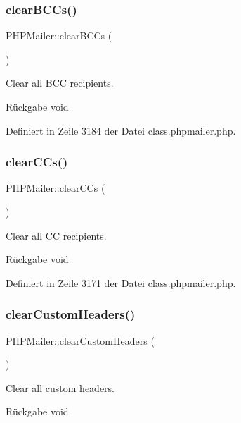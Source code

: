 \subsubsection{\texorpdfstring{clear\+B\+C\+Cs()}{clearBCCs()}}
{\footnotesize\ttfamily P\+H\+P\+Mailer\+::clear\+B\+C\+Cs (\begin{DoxyParamCaption}{ }\end{DoxyParamCaption})}

Clear all B\+CC recipients. \begin{DoxyReturn}{Rückgabe}
void 
\end{DoxyReturn}


Definiert in Zeile 3184 der Datei class.\+phpmailer.\+php.

\mbox{\label{class_p_h_p_mailer_a6aadfef524b1d68dbd74c92edeb20e3b}} 
\subsubsection{\texorpdfstring{clear\+C\+Cs()}{clearCCs()}}
{\footnotesize\ttfamily P\+H\+P\+Mailer\+::clear\+C\+Cs (\begin{DoxyParamCaption}{ }\end{DoxyParamCaption})}

Clear all CC recipients. \begin{DoxyReturn}{Rückgabe}
void 
\end{DoxyReturn}


Definiert in Zeile 3171 der Datei class.\+phpmailer.\+php.

\mbox{\label{class_p_h_p_mailer_a3cafb993a1f3ea98d157de510cdb7751}} 
\subsubsection{\texorpdfstring{clear\+Custom\+Headers()}{clearCustomHeaders()}}
{\footnotesize\ttfamily P\+H\+P\+Mailer\+::clear\+Custom\+Headers (\begin{DoxyParamCaption}{ }\end{DoxyParamCaption})}

Clear all custom headers. \begin{DoxyReturn}{Rückgabe}
void 
\end{DoxyReturn}


